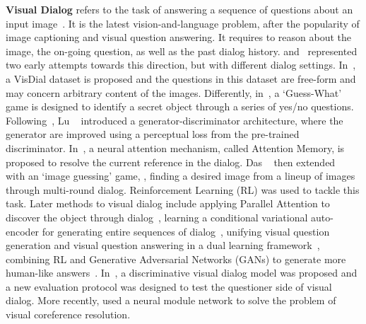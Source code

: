 \documentclass[10pt,twocolumn,letterpaper]{article}
\begin{document}
\noindent\textbf{Visual Dialog} refers to the task of answering a sequence
of questions about an input image~\cite{das2017visual,de2017guesswhat}. It is the latest vision-and-language problem, after the popularity of image captioning and visual question answering. It requires to reason about the image, the on-going question, as well as the past dialog history. \cite{das2017visual} and~\cite{de2017guesswhat} represented two early attempts towards this direction, but with different dialog settings. In~\cite{das2017visual}, a VisDial dataset is proposed and the questions in this dataset are free-form and may concern arbitrary content of the images. Differently, in~\cite{de2017guesswhat}, a `Guess-What' game is designed to identify a secret object through a series of yes/no questions. Following~\cite{das2017visual}, Lu \etal~\cite{lu2017best} introduced a generator-discriminator architecture, where the generator are improved using a perceptual loss from the pre-trained discriminator. In~\cite{seo2017visual}, a neural attention mechanism, called Attention Memory,  is proposed to resolve the current reference in the dialog. Das \etal~\cite{das2017learning} then extended~\cite{das2017visual} with an `image guessing' game, \ie, finding a desired image from a lineup of images through multi-round dialog. Reinforcement Learning (RL) was used to tackle this task. Later methods to visual dialog include applying Parallel Attention to discover the object through dialog~\cite{zhuang2018parallel}, learning a conditional variational auto-encoder for generating entire sequences of dialog~\cite{Massiceti_2018_CVPR}, unifying visual question generation and visual question answering in a dual learning framework~\cite{jain2018two}, combining RL
and Generative Adversarial Networks (GANs) to generate more human-like answers~\cite{Wu_2018_CVPR}.
In~\cite{jain2018two}, a discriminative visual dialog model was proposed and a new evaluation protocol was designed to test the questioner side of visual dialog. More recently, \cite{Kottur_2018_ECCV} used a neural module network to solve the problem of visual coreference resolution.
\end{document}
